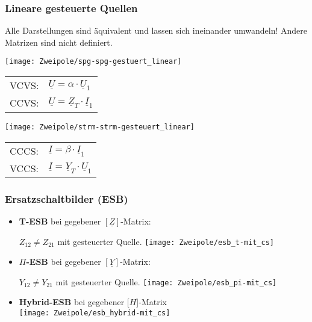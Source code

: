 \subsubsection{Lineare gesteuerte Quellen}
Alle Darstellungen sind äquivalent und lassen sich ineinander umwandeln! Andere Matrizen sind nicht definiert.\\
    \begin{minipage}{0.5\columnwidth}
    	\renewcommand{\arraystretch}{1.3}
        \texttt{[image: Zweipole/spg-spg-gestuert\_linear]}\\
    \begin{tabular}{ll}
        VCVS:& $\underline{U}=\alpha\cdot \underline{U}_1$\\
        CCVS:& $\underline{U}=\underline{Z}_T\cdot \underline{I}_1 $
    \end{tabular}
    \end{minipage}
    \begin{minipage}{0.5\columnwidth}
    	\renewcommand{\arraystretch}{1.3}
        \texttt{[image: Zweipole/strm-strm-gesteuert\_linear]}\\
    \begin{tabular}{ll}
        CCCS:& $\underline{I}=\beta\cdot \underline{I}_1$\\
        VCCS:& $\underline{I}=\underline{Y}_T\cdot \underline{U}_1$
    \end{tabular}
    \end{minipage}

\subsubsection{Ersatzschaltbilder (ESB)}
\begin{itemize}
    \item \textbf{T-ESB} bei gegebener $[\underline{Z}]$-Matrix:
   
    	$Z_{12} \neq Z_{21}$ mit gesteuerter Quelle. 
        \texttt{[image: Zweipole/esb\_t-mit\_cs]}
        \raggedright
        
    \item \textbf{$\Pi$-ESB} bei gegebener $[\underline{Y}]$-Matrix:
    
        $Y_{12} \neq Y_{21}$ mit gesteuerter Quelle.
        \texttt{[image: Zweipole/esb\_pi-mit\_cs]}
        \raggedright
        
    \item  \textbf{Hybrid-ESB} bei gegebener [\underline{$H$}]-Matrix\\
        \texttt{[image: Zweipole/esb\_hybrid-mit\_cs]}
\end{itemize}

